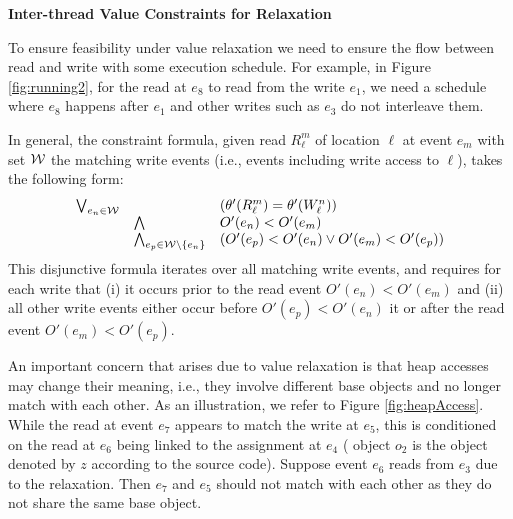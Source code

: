 {\bf Inter-thread Value Constraints for Relaxation\ } 

To ensure feasibility under value relaxation
we need to ensure the flow between read and write with some execution schedule. 
For example, in Figure \ref{fig:running2}, for the read at $e_8$ to read 
from the write  $e_1$, we need a schedule where 
$e_8$ happens after $e_1$ and other writes such as $e_3$ do not interleave them.




In general, the constraint formula, given read $R^{m}_{\ell}$ of location 
$\ell$ at event $e_m$ with set ${\cal W}$ the matching write events 
(i.e., events including write access to $\ell$), takes the following form:
$$
{\small
\begin{array}{rll}
\bigvee_{e_n \in {\cal W}} &  & (\theta'(R^{m}_{\ell}) = \theta'(W^{n}_{\ell})) \\
&		\bigwedge 	&  O'(e_n) < O'(e_m) \\
&		\bigwedge_{e_p \in {\cal W} \setminus \{ e_n \}} & (O'(e_p) < O'(e_n) \vee O'(e_m) < O'(e_p))
\end{array}
}
$$
This disjunctive formula iterates over all matching write events, and requires 
for each write that (i) it occurs prior to the 
read event $O'(e_n) < O'(e_m)$ and (ii) all other write events either 
occur before $O'(e_p) < O'(e_n)$ it or after the read 
event $O'(e_m) < O'(e_p)$.

An important concern that arises due to value relaxation 
is that heap accesses may change their meaning, i.e., they involve 
different base objects and no longer match with each other. As an 
illustration, we refer to Figure \ref{fig:heapAccess}. While the read at 
event $e_7$ appears to match the write at $e_5$, this is conditioned 
on the read at $e_6$ being linked to the assignment at $e_4$ (
object $o_2$ is the object denoted by $z$ according to the source code). 
Suppose event $e_6$ reads from $e_3$ due to the relaxation. Then $e_7$ and 
$e_5$ should not match with each other as they do not share the same base object. 



